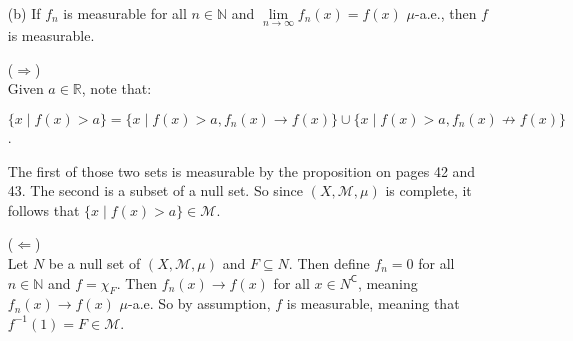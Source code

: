 \documentclass{book}
\newcommand{\exTwoP}{%
   \color{RedViolet}%
   \fontsize{13}{15}\selectfont%
}
\newcommand{\exPP}{%
   \color{RedViolet}%
   \fontsize{12}{14}\selectfont%
}
\newenvironment{myIndent}{%
   \begin{adjustwidth}{2.5em}{0em}%
}{%
   \end{adjustwidth}%
}
\newcommand{\comp}{\mathsf{C}}
\newcommand{\retTwo}{\hfill\bigbreak}
\begin{document}
\begin{enumerate}
   \item[(b)] If $f_n$ is measurable for all $n \in \mathbb{N}$ and $\lim\limits_{n \rightarrow \infty}f_n(x) = f(x)$ $\mu$-a.e., then $f$ is measurable.
   
   \begin{myIndent}\exTwoP
      ($\Longrightarrow$)\\
      Given $a \in \mathbb{R}$, note that:
      
      {\centering\exPP $\{x \mid f(x) > a\} = \{x \mid f(x) > a, f_n(x) \rightarrow f(x)\} \cup \{x \mid f(x) > a, f_n(x) \not\rightarrow f(x)\}$.\newpage\par}

      The first of those two sets is measurable by the proposition on pages 42 and 43. The second is a subset of a null set. So since $(X, \mathcal{M}, \mu)$ is complete, it follows that $\{x \mid f(x) > a\} \in \mathcal{M}$.\retTwo

      ($\Longleftarrow$)\\
      Let $N$ be a null set of $(X, \mathcal{M}, \mu)$ and $F \subseteq N$. Then define $f_n = 0$ for all $n \in \mathbb{N}$ and $f = \chi_F$. Then $f_n(x) \rightarrow f(x)$ for all $x \in N^\comp$, meaning $f_n(x) \rightarrow f(x)$ $\mu$-a.e. So by assumption, $f$ is measurable, meaning that $f^{-1}(1) = F \in \mathcal{M}$. 
      \retTwo
   \end{myIndent}
\end{enumerate}
\end{document}
